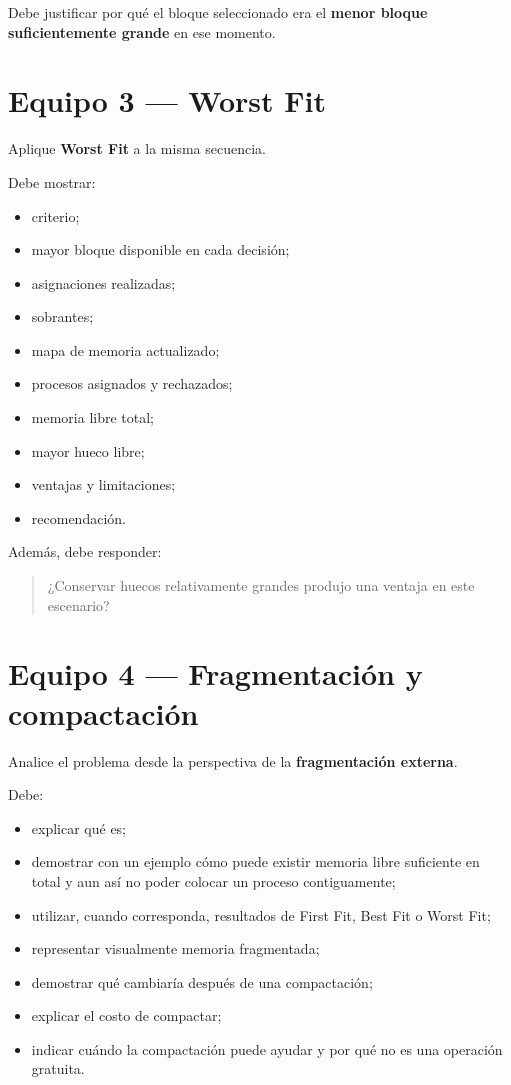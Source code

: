 \documentclass[
  spanish,
  letterpaper,
]{scrbook}
\providecommand{\tightlist}{%
  \setlength{\itemsep}{0pt}\setlength{\parskip}{0pt}}
\begin{document}
Debe justificar por qué el bloque seleccionado era el \textbf{menor
bloque suficientemente grande} en ese momento.

\section{Equipo 3 --- Worst Fit}\label{equipo-3-worst-fit}

Aplique \textbf{Worst Fit} a la misma secuencia.

Debe mostrar:

\begin{itemize}
\tightlist
\item
  criterio;
\item
  mayor bloque disponible en cada decisión;
\item
  asignaciones realizadas;
\item
  sobrantes;
\item
  mapa de memoria actualizado;
\item
  procesos asignados y rechazados;
\item
  memoria libre total;
\item
  mayor hueco libre;
\item
  ventajas y limitaciones;
\item
  recomendación.
\end{itemize}

Además, debe responder:

\begin{quote}
¿Conservar huecos relativamente grandes produjo una ventaja en este
escenario?
\end{quote}

\section{Equipo 4 --- Fragmentación y
compactación}\label{equipo-4-fragmentaciuxf3n-y-compactaciuxf3n}

Analice el problema desde la perspectiva de la \textbf{fragmentación
externa}.

Debe:

\begin{itemize}
\tightlist
\item
  explicar qué es;
\item
  demostrar con un ejemplo cómo puede existir memoria libre suficiente
  en total y aun así no poder colocar un proceso contiguamente;
\item
  utilizar, cuando corresponda, resultados de First Fit, Best Fit o
  Worst Fit;
\item
  representar visualmente memoria fragmentada;
\item
  demostrar qué cambiaría después de una compactación;
\item
  explicar el costo de compactar;
\item
  indicar cuándo la compactación puede ayudar y por qué no es una
  operación gratuita.
\end{itemize}
\end{document}
